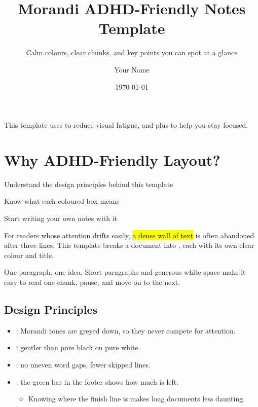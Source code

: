 \documentclass[english]{morandi-adhd}
\title{Morandi ADHD-Friendly Notes Template}
\subtitle{Calm colours, clear chunks, and key points you can spot at a glance}
\author{Your Name}
\date{\today}
\begin{document}
\maketitle

\begin{tldr}
  This template uses  to reduce visual fatigue, and
   plus  to help you stay focused.
\end{tldr}

\tableofcontents

\section{Why ADHD-Friendly Layout?}

\begin{goals}
  \begin{checklist}
    \item Understand the design principles behind this template
    \item Know what each coloured box means
    \item Start writing your own notes with it
  \end{checklist}
\end{goals}

For readers whose attention drifts easily, \hl{a dense wall of text} is often abandoned after
three lines. This template breaks a document into , each with its own clear
colour and title.

\begin{keypoint}
  One paragraph, one idea. Short paragraphs and generous white space make it easy to
  read one chunk, pause, and move on to the next.
\end{keypoint}

\subsection{Design Principles}

\begin{itemize}
  \item {}: Morandi tones are greyed down, so they never compete for attention.
  \item {}: gentler than pure black on pure white.
  \item {}: no uneven word gaps, fewer skipped lines.
  \item {}: the green bar in the footer shows how much is left.
    \begin{itemize}
      \item Knowing where the finish line is makes long documents less daunting.
    \end{itemize}
\end{itemize}
\end{document}
